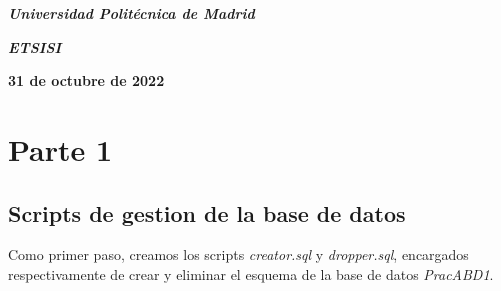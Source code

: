 \documentclass[a4paper, 11pt, oneside]{article} %
\newcommand{\plogo}{\fbox{$\mathcal{LCDPM}$}} %
\begin{document}
\begin{titlepage}
	\vspace{1.0\baselineskip} %
	
	\textit{\textbf{Universidad Politécnica de Madrid \\}} %

	\vspace{0.25\baselineskip} %

	\textit{\textbf{ETSISI}} %
	
	\vfill %
	
	
	\textbf{31 de octubre de 2022} %
	
	\vspace{0.5\baselineskip} %

	\plogo %

\end{titlepage}


\renewcommand*\contentsname{Índice} %

\setcounter{tocdepth}{3} %

\tableofcontents %

\newpage

	
\section{Parte 1}

\subsection{Scripts de gestion de la base de datos}

Como primer paso, creamos los scripts \emph{creator.sql} y \emph{dropper.sql}, encargados respectivamente de crear y eliminar el esquema de la base de datos \emph{PracABD1}.\\
\end{document}
